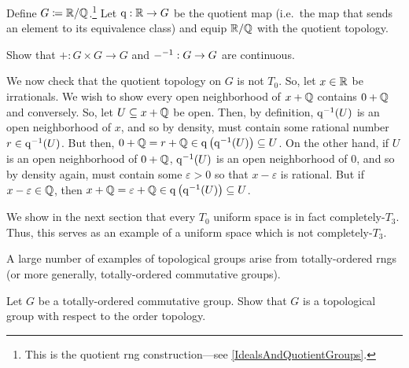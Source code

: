 \begin{exm}
\begin{savenotes}
Define $G\coloneqq \mathbb{R} /\mathbb{Q}$.\footnote{This is the quotient rng construction---see \cref{IdealsAndQuotientGroups}.}  Let $\mathrm{q} :\mathbb{R} \rightarrow G$ be the quotient map (i.e.~the map that sends an element to its equivalence class) and equip $\mathbb{R} /\mathbb{Q}$ with the quotient topology.
\begin{exr}
Show that $+:G\times G\rightarrow G$ and ${-} ^{-1}:G\rightarrow G$ are continuous.
\end{exr}
We now check that the quotient topology on $G$ is not $T_0$.  So, let $x\in \mathbb{R}$ be irrationals.  We wish to show every open neighborhood of $x+\mathbb{Q}$ contains $0+\mathbb{Q}$ and conversely.  So, let $U\subseteq x+\mathbb{Q}$ be open.  Then, by definition, $\mathrm{q} ^{-1}(U)$ is an open neighborhood of $x$, and so by density, must contain some rational number $r\in \mathrm{q} ^{-1}(U)$.  But then, $0+\mathbb{Q} =r+\mathbb{Q} \in \mathrm{q} \left( \mathrm{q} ^{-1}(U)\right) \subseteq U$.  On the other hand, if $U$ is an open neighborhood of $0+\mathbb{Q}$, $\mathrm{q} ^{-1}(U)$ is an open neighborhood of $0$, and so by density again, must contain some $\varepsilon >0$ so that $x-\varepsilon$ is rational.  But if $x-\varepsilon \in \mathbb{Q}$, then $x+\mathbb{Q} =\varepsilon +\mathbb{Q} \in \mathrm{q} \left( \mathrm{q} ^{-1}(U)\right) \subseteq U$.
\begin{rmk}
We show in the next section that every $T_0$ uniform space is in fact completely-$T_3$.  Thus, this serves as an example of a uniform space which is not completely-$T_3$.
\end{rmk}
\end{savenotes}
\end{exm}
A large number of examples of topological groups arise from totally-ordered rngs (or more generally, totally-ordered commutative groups).
\begin{exr}\label{exr4.8.58}
Let $G$ be a totally-ordered commutative group.  Show that $G$ is a topological group with respect to the order topology.
\end{exr}

